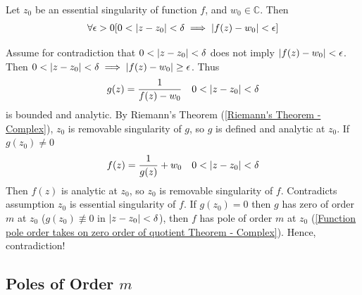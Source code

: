 \documentclass[12pt, english]{book}
\makeatletter
\renewenvironment{proof}[1][\proofname]{\par
	\pushQED{\qed}%
	\normalfont \topsep6\p@\@plus6\p@\relax
	\list{}{%
		\settowidth{\leftmargin}{\itshape\proofname:\hskip\labelsep}%
		\setlength{\labelwidth}{0pt}%
		\setlength{\itemindent}{-\leftmargin}%
	}%
	\item[\hskip\labelsep\itshape#1\@addpunct{:}]\ignorespaces
	}{ \popQED\endlist\@endpefalse}
\makeatother
\begin{document}
	\begin{theorem}
		\label{Casorati-Weierstrass Theorem - Complex}
		Let \(z_0\) be an essential singularity of function \(f\), and \(w_0 \in \mathbb{C}\). Then 
		\begin{align*}
			\forall \epsilon > 0 [0<\abs{z-z_0}<\delta \implies \abs{f(z) - w_0}< \epsilon]
		\end{align*}
	\end{theorem}
	\begin{proof}
		Assume for contradiction that \(0<\abs{z-z_0}<\delta \) does not imply \(\abs{f(z) - w_0}< \epsilon\). Then \(0<\abs{z-z_0}<\delta \implies \abs{f(z) - w_0} \geq \epsilon\). Thus
		\begin{align*}
			g(z) &= \frac{1}{f(z) - w_0} & 0<\abs{z-z_0} < \delta
		\end{align*}
		is bounded and analytic. By Riemann's Theorem (\cref{Riemann's Theorem - Complex}), \(z_0\) is removable singularity of \(g\), so \(g\) is defined and analytic at \(z_0\). If \(g(z_0) \neq 0\)
		\begin{align*}
			f(z) &= \frac{1}{g(z)} + w_0 & 0 < \abs{z - z_0} < \delta
		\end{align*} 
		Then \(f(z)\) is analytic at \(z_0\), so \(z_0\) is removable singularity of \(f\). Contradicts assumption \(z_0\) is essential singularity of \(f\).
	\end{proof}
	If \(g(z_0) = 0\) then \(g\) has zero of order \(m\) at \(z_0\) (\(g(z_0) \nequiv 0 \) in \( \abs{z-z_0} < \delta\)), then \(f\) has pole of order \(m\) at \(z_0\) (\cref{Function pole order takes on zero order of quotient Theorem - Complex}). Hence, contradiction!
	
	\subsection{Poles of Order \texorpdfstring{\(m\)}{TEXT}}
	
\end{document}
